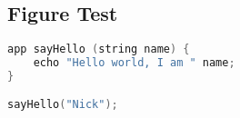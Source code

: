 \swiftColor
\subsection{Figure Test}

    \begin{lstlisting}[language=swift]
app sayHello (string name) {
    echo "Hello world, I am " name;
}

sayHello("Nick");
    \end{lstlisting}
